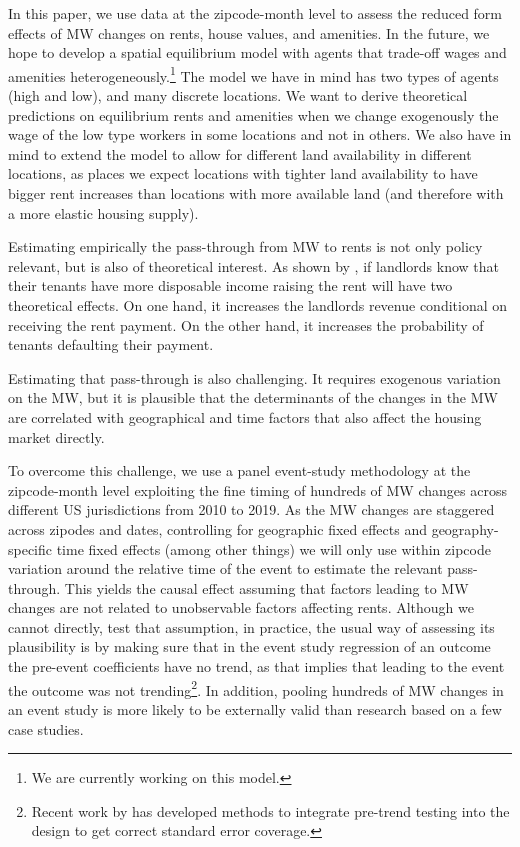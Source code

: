 \documentclass{article}
\begin{document}
 In this paper, we use data at the zipcode-month level to assess the reduced form effects of MW changes on rents, house values, and amenities. In the future, we hope to develop a spatial equilibrium model with agents that trade-off wages and amenities heterogeneously.\footnote{We are currently working on this model.} The model we have in mind has two types of agents (high and low), and many discrete locations. We want to derive theoretical predictions on equilibrium rents and amenities when we change exogenously the wage of the low type workers in some locations and not in others. We also have in mind to extend the model to allow for different land availability in different locations, as places we expect locations with tighter land availability to have bigger rent increases than locations with more available land (and therefore with a more elastic housing supply). 

Estimating empirically the pass-through from MW to rents is not only policy relevant, but is also of theoretical interest. As shown by \textcite{agarwal2019minimum}, if landlords know that their tenants have more disposable income raising the rent will have two theoretical effects. On one hand, it increases the landlords revenue conditional on receiving the rent payment. On the other hand, it increases the probability of tenants defaulting their payment. 

Estimating that pass-through is also challenging. It requires exogenous variation on the MW, but it is plausible that the determinants of the changes in the MW are correlated with geographical and time factors that also affect the housing market directly. 
 
To overcome this challenge, we use a panel event-study methodology \parencite{abraham2018estimating,borusyak2017revisiting} at the zipcode-month level exploiting the fine timing of hundreds of MW changes across different US jurisdictions from 2010 to 2019. As the MW changes are staggered across zipodes and dates, controlling for geographic fixed effects and geography-specific time fixed effects (among other things) we will only use within zipcode variation around the relative time of the event to estimate the relevant pass-through. This yields the causal effect assuming that factors leading to MW changes are not related to unobservable factors affecting rents. Although we cannot directly, test that assumption, in practice, the usual way of assessing its plausibility is by making sure that in the event study regression of an outcome the pre-event coefficients have no trend, as that implies that leading to the event the outcome was not trending\footnote{Recent work by \textcite{roth2018pre} has developed methods to integrate pre-trend testing into the design to get correct standard error coverage.}. In addition, pooling hundreds of MW changes in an event study is more likely to be externally valid than research based on a few case studies. 
\end{document}

